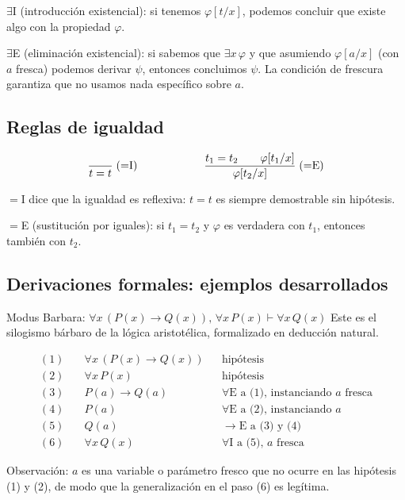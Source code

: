 $\exists$I (introducción existencial): si tenemos $\varphi[t/x]$, podemos concluir que existe algo con la propiedad $\varphi$.

$\exists$E (eliminación existencial): si sabemos que $\exists x\,\varphi$ y que asumiendo $\varphi[a/x]$ (con $a$ fresca) podemos derivar $\psi$, entonces concluimos $\psi$. La condición de frescura garantiza que no usamos nada específico sobre $a$.

\subsection{Reglas de igualdad}

\[
  \infr[{=}\mathrm{I}]{\quad}{t = t}
  \qquad\qquad\qquad
  \infr[{=}\mathrm{E}]{t_1 = t_2 \qquad \varphi[t_1/x]}{\varphi[t_2/x]}
\]

${=}$I dice que la igualdad es reflexiva: $t = t$ es siempre demostrable sin hipótesis.

${=}$E (sustitución por iguales): si $t_1 = t_2$ y $\varphi$ es verdadera con $t_1$, entonces también con $t_2$.

\subsection{Derivaciones formales: ejemplos desarrollados}

\begin{ejemplo}{Modus Barbara: $\forall x\,(P(x)\to Q(x)),\, \forall x\, P(x) \vdash \forall x\, Q(x)$}{}
Este es el silogismo bárbaro de la lógica aristotélica, formalizado en deducción natural.

\begin{align*}
(1)\quad &\forall x\,(P(x) \to Q(x)) && \text{hipótesis} \\
(2)\quad &\forall x\, P(x) && \text{hipótesis} \\
(3)\quad &P(a) \to Q(a) && \forall\mathrm{E} \text{ a (1), instanciando } a \text{ fresca} \\
(4)\quad &P(a) && \forall\mathrm{E} \text{ a (2), instanciando } a \\
(5)\quad &Q(a) && \to\mathrm{E} \text{ a (3) y (4)} \\
(6)\quad &\forall x\, Q(x) && \forall\mathrm{I} \text{ a (5), } a \text{ fresca}
\end{align*}

Observación: $a$ es una variable o parámetro fresco que no ocurre en las hipótesis (1) y (2), de modo que la generalización en el paso (6) es legítima.
\end{ejemplo}

